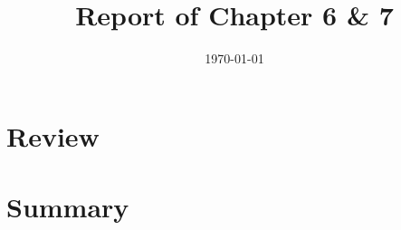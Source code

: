\documentclass[10pt, conference]{IEEEtran}
\begin{document}
    \title{Report of Chapter 6 \& 7}
    \author{}
    \date{\today}
    \maketitle

    \section{Review}

    \section{Summary}
\end{document}
